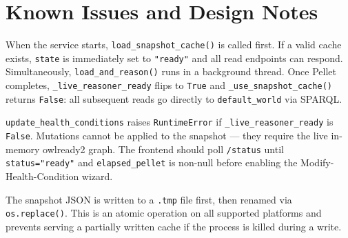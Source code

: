 ﻿\documentclass[12pt,a4paper]{article}
\begin{document}
\clearpage
\section{Known Issues and Design Notes}

\begin{tcolorbox}[colback=noteblue!40, colframe=blue!60!black,
                  title=Note: Two-tier serving model]
When the service starts, \texttt{load\_snapshot\_cache()} is called first. If a valid cache exists, \texttt{state} is immediately set to \texttt{"ready"} and all read endpoints can respond. Simultaneously, \texttt{load\_and\_reason()} runs in a background thread. Once Pellet completes, \texttt{\_live\_reasoner\_ready} flips to \texttt{True} and \texttt{\_use\_snapshot\_cache()} returns \texttt{False}: all subsequent reads go directly to \texttt{default\_world} via SPARQL.
\end{tcolorbox}

\vspace{0.6em}

\begin{tcolorbox}[colback=warnred!40, colframe=red!60!black,
                  title=Warning: HC mutations require the live reasoner]
\texttt{update\_health\_conditions} raises \texttt{RuntimeError} if \texttt{\_live\_reasoner\_ready} is \texttt{False}. Mutations cannot be applied to the snapshot --- they require the live in-memory owlready2 graph. The frontend should poll \texttt{/status} until \texttt{status="ready"} and \texttt{elapsed\_pellet} is non-null before enabling the Modify-Health-Condition wizard.
\end{tcolorbox}

\vspace{0.6em}

\begin{tcolorbox}[colback=importantbg!60, colframe=green!50!black,
                  title=Important: Atomic cache write]
The snapshot JSON is written to a \texttt{.tmp} file first, then renamed via \texttt{os.replace()}. This is an atomic operation on all supported platforms and prevents serving a partially written cache if the process is killed during a write.
\end{tcolorbox}
\end{document}
